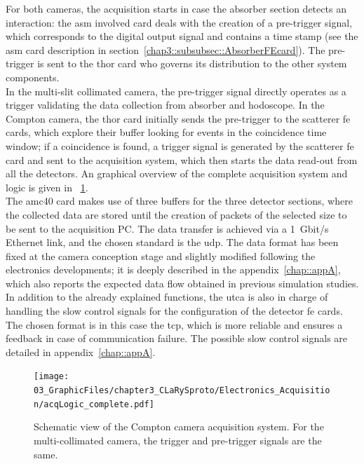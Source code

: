 For both cameras, the acquisition starts in case the absorber section detects an interaction: the \gls{asm} involved card deals with the creation of a pre-trigger signal, which corresponds to the digital output signal and contains a time stamp (see the \gls{asm} card description in section~\ref{chap3::subsubsec::AbsorberFEcard}). The pre-trigger is sent to the \gls{thor} card who governs its distribution to the other system components.\\ 
In the multi-slit collimated camera, the pre-trigger signal directly operates as a trigger validating the data collection from absorber and hodoscope. In the Compton camera, the \gls{thor} card initially sends the pre-trigger to the scatterer \gls{fe} cards, which explore their buffer looking for events in the coincidence time window; if a coincidence is found, a trigger signal is generated by the scatterer \gls{fe} card and sent to the acquisition system, which then starts the data read-out from all the detectors. An graphical overview of the complete acquisition system and logic is given in \figurename~\ref{chap3::fig::DAQscheme}.\\
The \gls{amc}40 card makes use of three buffers for the three detector sections, where the collected data are stored until the creation of packets of the selected size to be sent to the acquisition PC. The data transfer is achieved via a 1~Gbit/s Ethernet link, and the chosen standard is the \gls{udp}. The data format has been fixed at the camera conception stage and slightly modified following the electronics developments; it is deeply described in the appendix~\ref{chap::appA}, which also reports the expected data flow obtained in previous simulation studies.\\  
In addition to the already explained functions, the \gls{utca} is also in charge of handling the slow control signals for the configuration of the detector \gls{fe} cards. The chosen format is in this case the \gls{tcp}, which is more reliable and ensures a feedback in case of communication failure. The possible slow control signals are detailed in appendix~\ref{chap::appA}.\\

\begin{figure}[!htbp]
\centering
\texttt{[image: 03\_GraphicFiles/chapter3\_CLaRySproto/Electronics\_Acquisition/acqLogic\_complete.pdf]}
\caption{Schematic view of the Compton camera acquisition system. For the multi-collimated camera, the trigger and pre-trigger signals are the same.}
\label{chap3::fig::DAQscheme}
\end{figure}

